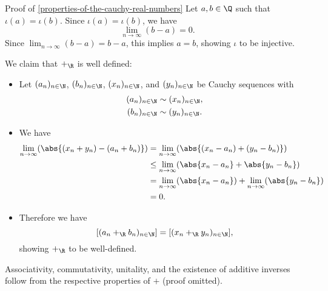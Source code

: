 \begin{Proof}{Proof of \cref{properties-of-the-cauchy-real-numbers}}
    Let $a,b\in\Q$ such that $\iota(a)=\iota(b)$. Since $\iota(a)=\iota(b)$, we have
    \[
        \lim_{n\to\infty}(b-a)%
        =%
        0.%
    \]%
    Since $\lim_{n\to\infty}(b-a)=b-a$, this implies $a=b$, showing $\iota$ to be injective.

    We claim that $+_{\R}$ is well defined:
    \begin{itemize}
        \item Let $(a_{n})_{n\in\N}$, $(b_{n})_{n\in\N}$, $(x_{n})_{n\in\N}$, and $(y_{n})_{n\in\N}$ be Cauchy sequences with
            \begin{align*}
                (a_{n})_{n\in\N} &\sim (x_{n})_{n\in\N},\\
                (b_{n})_{n\in\N} &\sim (y_{n})_{n\in\N}.
            \end{align*}
        \item We have
            \begin{align*}
                \lim_{n\to\infty}(\abs{(x_{n}+y_{n})-(a_{n}+b_{n})}) &=    \lim_{n\to\infty}(\abs{(x_{n}-a_{n})+(y_{n}-b_{n})})\\
                                                                     &\leq \lim_{n\to\infty}(\abs{x_{n}-a_{n}}+\abs{y_{n}-b_{n}})\\
                                                                     &=    \lim_{n\to\infty}(\abs{x_{n}-a_{n}})+\lim_{n\to\infty}(\abs{y_{n}-b_{n}})\\
                                                                     &=    0.
            \end{align*}
        \item Therefore we have
            \[
                [(a_{n}+_{\R}b_{n})_{n\in\N}]%
                =%
                [(x_{n}+_{\R}y_{n})_{n\in\N}],%
            \]%
            showing $+_{\R}$ to be well-defined.
    \end{itemize}
    Associativity, commutativity, unitality, and the existence of additive inverses follow from the respective properties of $+$ (proof omitted).


\end{Proof}
